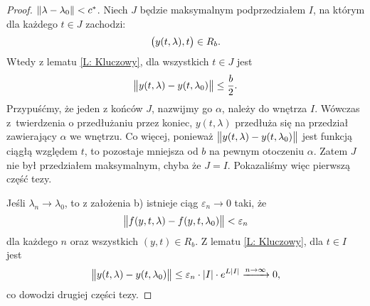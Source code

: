 \begin{proof}
  $\norm{\lambda - \lambda_0} < c^*$.
  Niech $J$ będzie maksymalnym podprzedziałem $I$, na którym dla każdego $t \in J$ zachodzi:
%
  \begin{equation*}
    \p[\big]{ y(t,\lambda), t } \in R_b.
  \end{equation*}
%
  Wtedy z lematu \ref{L: Kluczowy}, dla wszystkich $t \in J$ jest
%
  \begin{equation*}
    \norm[\big]{ y(t,\lambda) - y(t,\lambda_0) } \leq \frac b2.
  \end{equation*}
%
  Przypuśćmy, że jeden z końców $J$, nazwijmy go $\alpha$, należy do wnętrza $I$. Wówczas z~twierdzenia o przedłużaniu 
  przez koniec, $y(t,\lambda)$ przedłuża się na przedział zawierający $\alpha$ we wnętrzu. Co więcej, ponieważ 
  $\norm[\big]{ y(t,\lambda) - y(t,\lambda_0) }$ jest funkcją ciągłą względem $t$, to pozostaje mniejsza od 
  $b$ na pewnym otoczeniu $\alpha$. Zatem $J$ nie był przedziałem maksymalnym, chyba że $J = I$. Pokazaliśmy więc 
  pierwszą część tezy.
  
  Jeśli $\lambda_n \to \lambda_0$, to z założenia b) istnieje ciąg $\varepsilon_n \to 0$ taki, że
%
  \begin{equation*}
    \norm[\big]{ f(y,t,\lambda) - f(y,t,\lambda_0) } < \varepsilon_n
  \end{equation*}
%
  dla każdego $n$ oraz wszystkich $(y,t) \in R_b$. Z lematu \ref{L: Kluczowy}, dla $t \in I$ jest
%
  \begin{equation*}
    \norm[\big]{ y(t,\lambda) - y(t,\lambda_0) } \leq \varepsilon_n \cdot \abs{I} \cdot e^{L \abs{I}}
    \xrightarrow{n\to\infty} 0,
  \end{equation*}
%
  co dowodzi drugiej części tezy.
\end{proof}


































